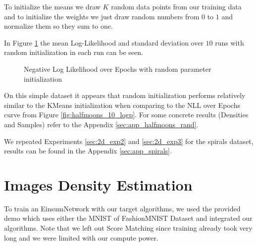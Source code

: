 To initialize the means we draw $K$ random data points from our training data and 
to initialize the weights we just draw random numbers from $0$ to $1$ and normalize them so they sum to one.

In Figure \ref{fig:halfmoons_10_random_logp} the mean Log-Likelihood and standard deviation over $10$ runs with random initialization in each run can be seen. 

\begin{figure}[H]
    \centering
    \caption{Negative Log Likelihood over Epochs with random parameter initialization}
    \label{fig:halfmoons_10_random_logp}
\end{figure}

On this simple dataset it appears that random initialization performs relatively similar to the KMeans initialization when comparing 
to the NLL over Epochs curve from Figure \ref{fig:halfmoons_10_logp}. For some concrete results (Densities and Samples) refer to the Appendix \ref{sec:app_halfmoons_rand}.

We repeated Experiments \ref{sec:2d_exp2} and \ref{sec:2d_exp3} for the spirals dataset, results can be found in the Appendix \ref{sec:app_spirals}.

\section{Images Density Estimation}

To train an EinsumNetwork with our target algorithms, we used the provided demo which uses either the MNIST of FashionMNIST Dataset \cite{mnist} and integrated 
our algorithms. Note that we left out Score Matching since training already took very long and we were limited with our compute power. 

